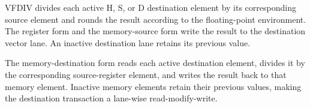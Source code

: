 VFDIV divides each active H, S, or D destination element by its corresponding
source element and rounds the result according to the floating-point
environment. The register form and the memory-source form write the result to
the destination vector lane. An inactive destination lane retains its
previous value.

The memory-destination form reads each active destination element, divides it
by the corresponding source-register element, and writes the result back to
that memory element. Inactive memory elements retain their previous values,
making the destination transaction a lane-wise read-modify-write.
